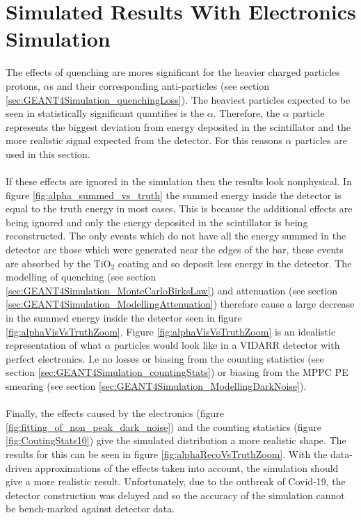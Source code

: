 \section{Simulated Results With Electronics Simulation}\label{sec:GEANT4Simulation_resultsPhysicalElectronics}
The effects of quenching are mores significant for the heavier charged particles  protons, $\alpha$s and their corresponding anti-particles (see section \ref{sec:GEANT4Simulation_quenchingLoss}). The heaviest particles expected to be seen in statistically significant quantifies is the $\alpha$. Therefore, the $\alpha$ particle represents the biggest deviation from energy deposited in the scintillator and the more realistic signal expected from the detector. For this reasons $\alpha$ particles are used in this section.  
\\\\If these effects are ignored in the simulation then the results look nonphysical. In figure \ref{fig:alpha_summed_vs_truth} the summed energy inside the detector is equal to the truth energy in most cases. This is because the additional effects are being ignored and only the energy deposited in the scintillator is being reconstructed. The only events which do not have all the energy summed in the detector are those which were generated near the edges of the bar, these events are absorbed by the TiO$_2$ coating and so deposit less energy in the detector. The modelling of quenching (see section \ref{sec:GEANT4Simulation_MonteCarloBirksLaw}) and attenuation (see section \ref{sec:GEANT4Simulation_ModellingAttenuation}) therefore cause a large decrease in the summed energy inside the detector seen in figure \ref{fig:alphaVisVsTruthZoom}. Figure \ref{fig:alphaVisVsTruthZoom} is an idealistic representation of what $\alpha$ particles would look like in a VIDARR detector with perfect electronics. I.e no losses or biasing from the counting statistics (see section \ref{sec:GEANT4Simulation_countingStats}) or biasing from the MPPC PE smearing (see section \ref{sec:GEANT4Simulation_ModellingDarkNoise}).
\\\\Finally, the effects caused by the electronics (figure \ref{fig:fitting_of_non_peak_dark_noise}) and the counting statistics (figure \ref{fig:CoutingStats10}) give the simulated distribution a more realistic shape. The results for this can be seen in figure \ref{fig:alphaRecoVsTruthZoom}. With the data-driven approximations of the effects taken into account, the simulation should give a more realistic result. Unfortunately, due to the outbreak of Covid-19, the detector construction was delayed and so the accuracy of the simulation cannot be bench-marked against detector data. 


